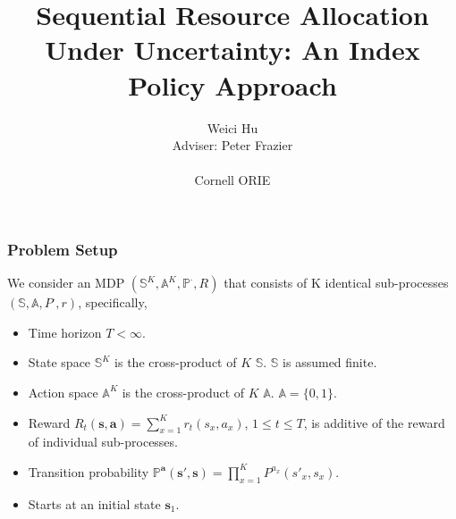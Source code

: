 \documentclass{beamer}
\newcommand{\av}{\mathbf{a}}
\newcommand{\allstates}{\mathbb{S}^K}
\newcommand{\allstate}{\mathbf{s}}
\newcommand{\allactions}{\mathbb{A}^K}
\newcommand{\allaction}{\av}
\newcommand{\allpr}{\mathbb{P}}
\newcommand{\allr}{R}
\newcommand{\subr}{r}
\newcommand{\substates}{\mathbb{S}}
\newcommand{\substate}{s}
\newcommand{\subactions}{\mathbb{A}}
\newcommand{\subpr}{P}
\newcommand{\subaction}{a}
\begin{document}
\title{Sequential Resource Allocation Under Uncertainty: An Index Policy Approach}
\author{Weici Hu\\
Adviser: Peter Frazier\\
\hspace{1mm}\\
Cornell ORIE}
\begin{frame}
   \maketitle
\end{frame}

\begin{frame}
\frametitle{Problem Setup}
We consider an MDP $(\allstates,\allactions,\allpr^{\cdot},\allr)$ that consists of K identical sub-processes $(\substates,\subactions,\subpr^{\cdot},\subr)$, specifically,
\begin{itemize}
\item Time horizon $T<\infty$.
\item State space $\allstates$ is the cross-product of $K$ $\substates$. $\substates$ is assumed finite.
\item Action space $\allactions$ is the cross-product of $K$ $\subactions$. $\subactions=\{0,1\}$.
\item Reward $\allr_t(\allstate,\allaction) = \sum_{x=1}^K \subr_t(\substate_x,\subaction_x)$, $1\leq t\leq T$, is additive of the reward of individual sub-processes.
\item Transition probability $\allpr^{\allaction}(\allstate',\allstate) = \prod_{x=1}^{K}\subpr^{\subaction_x}(\substate'_x,\substate_x)$.
\item Starts at an initial state $\allstate_1$.
\end{itemize}
\end{frame}
\end{document}
